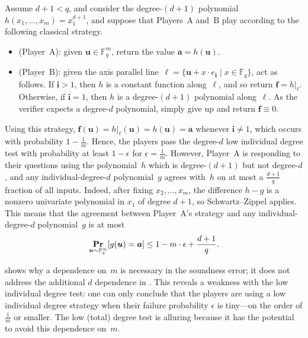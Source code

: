\documentclass[11pt]{article}
\theoremstyle{definition}
\renewcommand{\Pr}{\mathop{\bf Pr\/}}
\newcommand{\F}{\mathbb F}
\newcommand{\eps}{\epsilon}
\newcommand{\ba}{\boldsymbol{a}}
\newcommand{\boldf}{\boldsymbol{f}}
\newcommand{\bi}{\boldsymbol{i}}
\newcommand{\bell}{\boldsymbol{\ell}}
\newcommand{\bu}{\boldsymbol{u}}
\begin{document}
\begin{example}\label{ex:bad-individual-degree-example}
Assume $d+1<q$, and consider the degree-$(d+1)$ polynomial
$h(x_1, \ldots, x_m) = x_1^{d+1}$,
and suppose that Players~$\mathrm{A}$ and~$\mathrm{B}$ play according to the following classical strategy.
\begin{itemize}
\item[$\circ$] (Player~$\mathrm{A}$): given $\bu \in \F_q^m$, return the value $\ba = h(\bu)$.
\item[$\circ$] (Player~$\mathrm{B}$): given the axis parallel line~$\bell = \{\bu + x \cdot e_{\bi} \mid x \in \F_q\}$, act as follows.
				If $\bi > 1$, then $h$ is a constant function along~$\bell$, and so return $\boldf = h|_{\bell}$.
				Otherwise, if $\bi = 1$, then $h$ is a degree-$(d+1)$ polynomial along~$\bell$.
				As the verifier expects a degree-$d$ polynomial,
				simply give up and return $\boldf \equiv 0$.
\end{itemize}
Using this strategy, $\boldf(\bu) = h|_{\bell}(\bu) = h(\bu) = \ba$ whenever $\bi \neq 1$, which occurs with probability $1- \frac{1}{m}$.
Hence, the players pass the degree-$d$ low individual degree test with probability at least $1 -\eps$ for $\eps = \frac{1}{m}$.
However, Player~$\mathrm{A}$ is responding to their questions using the polynomial~$h$
which is degree-$(d+1)$ but not degree-$d$,
and any individual-degree-$d$ polynomial~$g$ agrees with~$h$ on at
most a $\frac{d+1}{q}$ fraction of all inputs.  Indeed, after fixing
$x_2,\ldots,x_m$, the difference $h-g$ is a nonzero univariate
polynomial in $x_1$ of degree $d+1$, so Schwartz--Zippel applies.
This means that the agreement between Player~$\mathrm{A}$'s strategy and any individual-degree-$d$ polynomial~$g$ is at most
\begin{equation*}
\Pr_{\bu \sim \F_q^m}[g(\bu) = \ba]
\leq
1 - m \cdot \eps + \frac{d+1}{q}.
\end{equation*}
\end{example}

 shows why a dependence on~$m$
is necessary in the soundness error; it does not address the additional
$d$ dependence in .
This reveals a weakness with the low individual degree test:
one can only conclude that the players are using a low individual degree strategy
when their failure probability $\eps$ is tiny---on the order of $\frac{1}{m}$ or smaller.
The low (total) degree test is alluring because it has the potential to avoid this dependence on~$m$.
\end{document}
